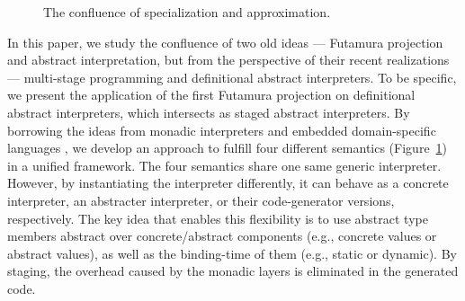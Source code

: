 \begin{figure}[h]
  \caption{The confluence of specialization and approximation.}
  \label{confluence}
\end{figure}

In this paper, we study the confluence of two old ideas --- Futamura projection
and abstract interpretation, but from the perspective of their recent
realizations --- multi-stage programming and definitional abstract interpreters.
To be specific, we present the application of the first Futamura projection on
definitional abstract interpreters, which intersects as staged abstract
interpreters. By borrowing the ideas from monadic interpreters
\cite{Steele:1994:BIC:174675.178068, DBLP:conf/popl/LiangHJ95,
DBLP:journals/pacmpl/DaraisLNH17, Sergey:2013:MAI:2491956.2491979} and embedded
domain-specific languages \cite{DBLP:conf/snapl/RompfBLSJAOSKDK15,
DBLP:journals/jfp/CaretteKS09, DBLP:conf/icfp/GibbonsW14}, we develop an
approach to fulfill four different semantics (Figure~\ref{confluence}) in a
unified framework. The four semantics share one same generic interpreter.
However, by instantiating the interpreter differently, it can behave as a
concrete interpreter, an abstracter interpreter, or their code-generator
versions, respectively. The key idea that enables this flexibility is to use
abstract type members abstract over concrete/abstract components (e.g., concrete
values or abstract values), as well as the binding-time of them (e.g., static or
dynamic). By staging, the overhead caused by the monadic layers is eliminated in
the generated code.

